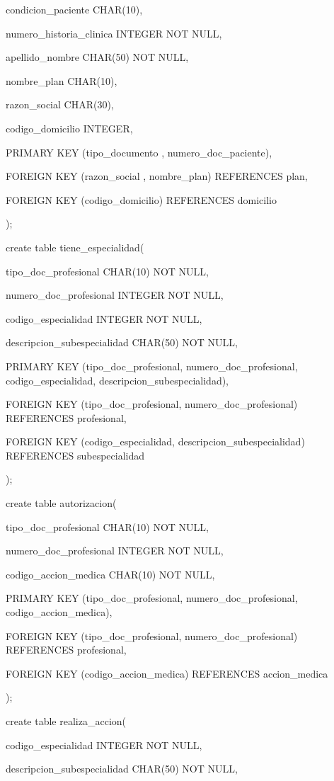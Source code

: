\documentclass[a4paper,11pt]{article}
\begin{document}
condicion\_paciente   CHAR(10),

numero\_historia\_clinica INTEGER NOT NULL,    

apellido\_nombre   CHAR(50) NOT NULL,    

nombre\_plan    CHAR(10),    

razon\_social    CHAR(30),

codigo\_domicilio  INTEGER,

PRIMARY KEY (tipo\_documento ,  numero\_doc\_paciente),

FOREIGN KEY (razon\_social , nombre\_plan) REFERENCES plan,

FOREIGN KEY (codigo\_domicilio) REFERENCES domicilio

); 

create table tiene\_especialidad(

tipo\_doc\_profesional  CHAR(10) NOT NULL,

numero\_doc\_profesional   INTEGER NOT NULL,

codigo\_especialidad  INTEGER NOT NULL, 

descripcion\_subespecialidad CHAR(50) NOT NULL,

PRIMARY KEY (tipo\_doc\_profesional, numero\_doc\_profesional, codigo\_especialidad, 
descripcion\_subespecialidad),

FOREIGN KEY (tipo\_doc\_profesional, numero\_doc\_profesional)     REFERENCES profesional,

FOREIGN KEY (codigo\_especialidad, descripcion\_subespecialidad) REFERENCES subespecialidad

);

create table autorizacion(

tipo\_doc\_profesional  CHAR(10) NOT NULL,

numero\_doc\_profesional   INTEGER NOT NULL,

codigo\_accion\_medica  CHAR(10) NOT NULL, 

PRIMARY KEY (tipo\_doc\_profesional, numero\_doc\_profesional, codigo\_accion\_medica),

FOREIGN KEY (tipo\_doc\_profesional, numero\_doc\_profesional)     REFERENCES profesional,

FOREIGN KEY (codigo\_accion\_medica) REFERENCES accion\_medica

); 

create table realiza\_accion(

codigo\_especialidad  INTEGER NOT NULL, 

descripcion\_subespecialidad CHAR(50) NOT NULL,
\end{document}
